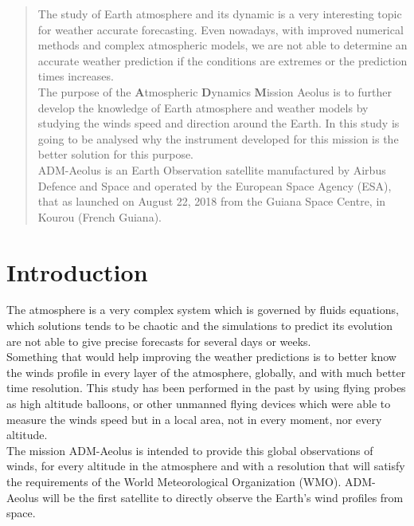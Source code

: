 \begin{abstract}
The study of Earth atmosphere and its dynamic is a very interesting topic for
weather accurate forecasting. Even nowadays, with improved numerical methods
and complex atmospheric models, we are not able to determine an accurate weather
prediction if the conditions are extremes or the prediction times increases.\\

The purpose of the \textbf{A}tmospheric \textbf{D}ynamics \textbf{M}ission Aeolus
is to further develop the knowledge of Earth atmosphere and weather models by
studying the winds speed and direction around the Earth.
In this study is going to be analysed why the instrument developed for this
mission is the better solution for this purpose.\\

ADM-Aeolus is an Earth Observation satellite manufactured by Airbus Defence and Space
and operated by the European Space Agency (ESA), that as launched on August 22, 2018
from the Guiana Space Centre, in Kourou (French Guiana).\\
\end{abstract}

\section{Introduction}

The atmosphere is a very complex system which is governed by fluids equations,
which solutions tends to be chaotic and the simulations to predict its evolution
are not able to give precise forecasts for several days or weeks.\\

Something that would help improving the weather predictions is to better know
the winds profile in every layer of the atmosphere, globally, and with much better
time resolution. This study has been performed in the past by using flying probes
as high altitude balloons, or other unmanned flying devices which were able to
measure the winds speed but in a local area, not in every moment, nor every altitude.\\

The mission ADM-Aeolus is intended to provide this global observations of winds,
for every altitude in the atmosphere and with a resolution that will satisfy the
requirements of the World Meteorological Organization (WMO). ADM-Aeolus will
be the first satellite to directly observe the Earth’s wind profiles from space.
\cite{Endemann2004}\\

